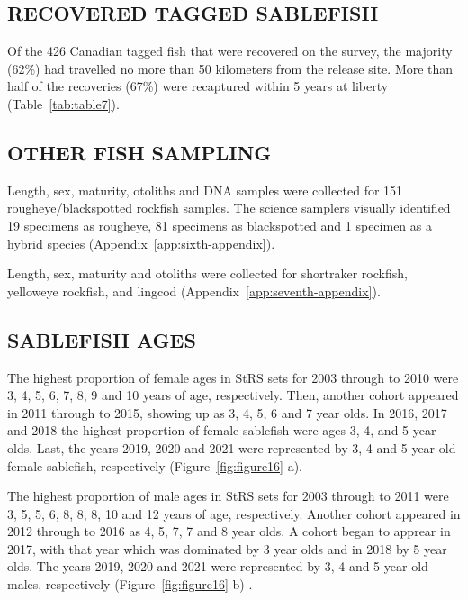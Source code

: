 \documentclass[12pt]{article}\usepackage[]{graphicx}\usepackage[]{color}
\begin{document}
\hypertarget{recovered-tagged-sablefish}{%
\subsection{RECOVERED TAGGED SABLEFISH}\label{recovered-tagged-sablefish}}

Of the 426 Canadian tagged fish that were recovered on the survey, the majority (62\%) had travelled no more than 50 kilometers from the release site. More than half of the recoveries (67\%) were recaptured within 5 years at liberty (Table~\ref{tab:table7}).

\hypertarget{other-fish-sampling}{%
\subsection{OTHER FISH SAMPLING}\label{other-fish-sampling}}

Length, sex, maturity, otoliths and DNA samples were collected for 151 rougheye/blackspotted rockfish samples. The science samplers visually identified 19 specimens as rougheye, 81 specimens as blackspotted and 1 specimen as a hybrid species (Appendix~\ref{app:sixth-appendix}).

Length, sex, maturity and otoliths were collected for shortraker rockfish, yelloweye rockfish, and lingcod (Appendix~\ref{app:seventh-appendix}).

\hypertarget{sablefish-ages}{%
\subsection{SABLEFISH AGES}\label{sablefish-ages}}

The highest proportion of female ages in StRS sets for 2003 through to 2010 were 3, 4, 5, 6, 7, 8, 9 and 10 years of age, respectively. Then, another cohort appeared in 2011 through to 2015, showing up as 3, 4, 5, 6 and 7 year olds. In 2016, 2017 and 2018 the highest proportion of female sablefish were ages 3, 4, and 5 year olds. Last, the years 2019, 2020 and 2021 were represented by 3, 4 and 5 year old female sablefish, respectively (Figure~\ref{fig:figure16} a).

The highest proportion of male ages in StRS sets for 2003 through to 2011 were 3, 5, 5, 6, 8, 8, 8, 10 and 12 years of age, respectively. Another cohort appeared in 2012 through to 2016 as 4, 5, 7, 7 and 8 year olds. A cohort began to apprear in 2017, with that year which was dominated by 3 year olds and in 2018 by 5 year olds. The years 2019, 2020 and 2021 were represented by 3, 4 and 5 year old males, respectively (Figure~\ref{fig:figure16} b) .
\end{document}
